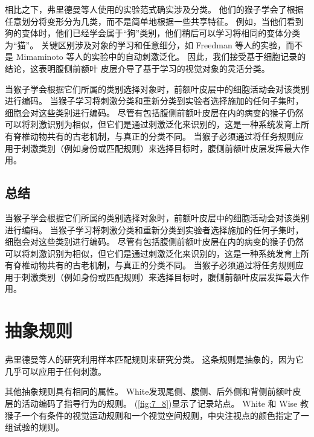 相比之下，弗里德曼等人使用的实验范式\cite{freedman2002visual}确实涉及分类。 
他们的猴子学会了根据任意划分将变形分为几类，而不是简单地根据一些共享特征。
例如，当他们看到狗的变体时，他们已经学会属于“狗”类别，他们稍后可以学习将相同的变体分类为“猫”。
关键区别涉及对象的学习和任意细分，如 Freedman 等人的实验，而不是 Mimaminoto 等人的实验中的自动刺激泛化。
因此，我们接受基于细胞记录的结论，这表明腹侧前额叶 皮层介导了基于学习的视觉对象的灵活分类。
\par


当猴子学会根据它们所属的类别选择对象时，前额叶皮层中的细胞活动会对该类别进行编码。
当猴子学习将刺激分类和重新分类到实验者选择施加的任何子集时，细胞会对这些类别进行编码。
尽管有包括腹侧前额叶皮层在内的病变的猴子仍然可以将刺激识别为相似，但它们是通过刺激泛化来识别的，这是一种系统发育上所有脊椎动物共有的古老机制，与真正的分类不同。
当猴子必须通过将任务规则应用于刺激类别（例如身份或匹配规则）来选择目标时，腹侧前额叶皮层发挥最大作用。



\subsection{总结}
\par
当猴子学会根据它们所属的类别选择对象时，前额叶皮层中的细胞活动会对该类别进行编码。
当猴子学习将刺激分类和重新分类到实验者选择施加的任何子集时，细胞会对这些类别进行编码。
尽管有包括腹侧前额叶皮层在内的病变的猴子仍然可以将刺激识别为相似，但它们是通过刺激泛化来识别的，这是一种系统发育上所有脊椎动物共有的古老机制，与真正的分类不同。
当猴子必须通过将任务规则应用于刺激类别（例如身份或匹配规则）来选择目标时，腹侧前额叶皮层发挥最大作用。



\section{抽象规则}
\par
弗里德曼等人的研究\cite{freedman2002visual}利用样本匹配规则来研究分类。 
这条规则是抽象的，因为它几乎可以应用于任何刺激。
\par


其他抽象规则具有相同的属性。
White\cite{white1999rule}发现尾侧、腹侧、后外侧和背侧前额叶皮层的活动编码了指导行为的规则。 
(\ref{fig:7_8})显示了记录站点。 
White 和 Wise 教猴子一个有条件的视觉运动规则和一个视觉空间规则，中央注视点的颜色指定了一组试验的规则。


